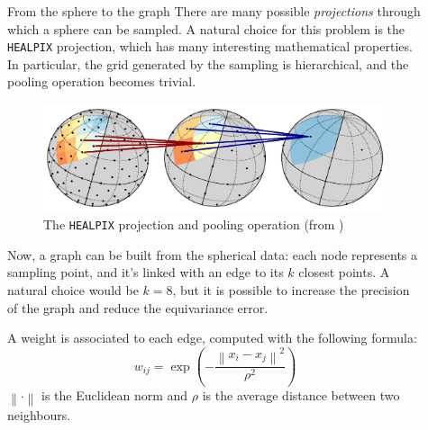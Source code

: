 \documentclass[final]{beamer}
\newcommand{\norm}[1]{\left\lVert#1\right\rVert}
\newlength{\sepwidth}
\newlength{\colwidth}
\newcommand{\separatorcolumn}{\begin{column}{\sepwidth}\end{column}}
\begin{document}
\begin{frame}[t]
\begin{columns}[t]
\begin{column}{\colwidth}
  \begin{block}{From the sphere to the graph}
    There are many possible \emph{projections} through which a sphere can be sampled. A natural choice for this problem is the \texttt{HEALPIX} projection, which has many interesting mathematical properties. In particular, the grid generated by the sampling is hierarchical, and the pooling operation becomes trivial.

    \begin{figure}[h]
      \includegraphics[width=0.7\colwidth]{healpix-pooling.png}
      \caption{The \texttt{HEALPIX} projection and pooling operation (from \cite{deepshpere_cosmo})}
    \end{figure}

    Now, a graph can be built from the spherical data: each node represents a sampling point, and it's linked with an edge to its $k$ closest points. A natural choice would be $k = 8$, but it is possible to increase the precision of the graph and reduce the equivariance error.
    
    A weight is associated to each edge, computed with the following formula:
    $$w_{ij} = \exp \left( - \frac{\norm{x_i - x_j}^2}{\rho^2} \right)$$
    $\norm{\cdot}$ is the Euclidean norm and $\rho$ is the average distance between two neighbours.
  \end{block}

\end{column}

\separatorcolumn

\begin{column}{\colwidth}


\end{column}
\end{columns}
\end{frame}
\end{document}
